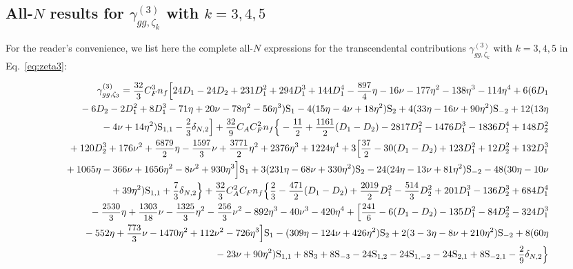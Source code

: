 \documentclass[
 twocolumn,
 superscriptaddress,
 preprintnumbers,
 nofootinbib,
 amsmath,amssymb,
 aps,
 prl
 ]{revtex4-2}
\newcommand\HS{\mathrm{S}}
\def\D#1{D_#1}
\def\frct#1#2{\mbox{\small{$\displaystyle\frac{#1}{#2}$}}}
\begin{document}
\begin{widetext}
\boldmath
\subsection{All-$N$ results for $\gamma_{gg,\zeta_k}^{(3)}$ with $k=3,4,5$}
\label{supplement:2}
\unboldmath

For the reader's convenience, we list here the complete all-$N$ expressions for the transcendental contributions $\gamma_{gg,\zeta_k}^{(3)}$ with $k=3,4,5$ in
Eq.~\eqref{eq:zeta3}:


\begin{eqnarray}
&&\gamma_{gg,\zeta_3}^{(3)}=





\frct{32}{3}\*C_F^3\*n_f\*
\Big[
24\*\D1
-24\*\D2
+231\*\D1^2
+294\*\D1^3
+144\*\D1^4
-\frct{897}{4}\*\eta
-16\*\nu
-177\*\eta^2
-138\*\eta^3
-114\*\eta^4
+6\*(
6\*\D1
\nonumber\\
&&{}
-6\*\D2
-2\*\D1^2
+8\*\D1^3
-71\*\eta
+20\*\nu
-78\*\eta^2
-56\*\eta^3
)\*\HS_{1}
-4\*(15\*\eta
-4\*\nu
+18\*\eta^2
)\*\HS_{2}
+4\*(33\*\eta
-16\*\nu
+90\*\eta^2
)\*\HS_{-2}
+12\*(13\*\eta
\nonumber\\
&&{}-4\*\nu
+14\*\eta^2
)\*\HS_{1,1}
-\frct{2}{3}\*\delta_{N,2}
\Big]

+\frct{32}{9}\*C_A\*C_F^2\*n_f\*\Big\{
-\frct{11}{2}
+\frct{1161}{2}\*(\D1-\D2)
-2817\*\D1^2
-1476\*\D1^3
-1836\*\D1^4
+148\*\D2^2
\nonumber\\
&&{}
+120\*\D2^3
+176\*\nu^2
+\frct{6879}{2}\*\eta
-\frct{1597}{3}\*\nu
+\frct{3771}{2}\*\eta^2
+2376\*\eta^3
+1224\*\eta^4
+3\*\Big[\frct{37}{2}
-30\*(\D1-\D2)
+123\*\D1^2
+12\*\D2^2
+132\*\D1^3
\nonumber\\
&&{}
+1065\*\eta
-366\*\nu
+1656\*\eta^2
-8\*\nu^2
+930\*\eta^3
\Big]\*\HS_{1}
+3\*(231\*\eta
-68\*\nu
+330\*\eta^2
)\*\HS_{2}
-24\*(24\*\eta
-13\*\nu
+81\*\eta^2
)\*\HS_{-2}
-48\*(30\*\eta
-10\*\nu
\nonumber\\
&&{}
+39\*\eta^2
)\*\HS_{1,1}
+\frct{7}{3}\*\delta_{N,2}
\Big\}

+\frct{32}{3}\*C_A^2\*C_F\*n_f\*\Big\{\frct{2}{3}
-\frct{471}{2}\*(\D1-\D2)
+\frct{2019}{2}\*\D1^2
-\frct{514}{3}\*\D2^2
+201\*\D1^3
-136\*\D2^3
+684\*\D1^4
\nonumber\\
&&{}
-\frct{2530}{3}\*\eta
+\frct{1303}{18}\*\nu
-\frct{1325}{3}\*\eta^2
-\frct{256}{3}\*\nu^2
-892\*\eta^3
-40\*\nu^3
-420\*\eta^4
+\Big[\frct{241}{6}
-6\*(\D1-\D2)
-135\*\D1^2
-84\*\D2^2
-324\*\D1^3
\nonumber\\
&&{}
-552\*\eta
+\frct{773}{3}\*\nu
-1470\*\eta^2
+112\*\nu^2
-726\*\eta^3
\Big]\*\HS_{1}
-(
309\*\eta
-124\*\nu
+426\*\eta^2
)\*\HS_{2}
+2\*(3
-3\*\eta
-8\*\nu
+210\*\eta^2
)\*\HS_{-2}
+8\*(60\*\eta
\nonumber\\
&&{}
-23\*\nu
+90\*\eta^2
)\*\HS_{1,1}
+8\*\HS_{3}
+8\*\HS_{-3}
-24\*\HS_{1,2}
-24\*\HS_{1,-2}
-24\*\HS_{2,1}
+8\*\HS_{-2,1}
-\frct{2}{9}\*\delta_{N,2}
\Big\}


\end{eqnarray}
\end{widetext}
\end{document}
